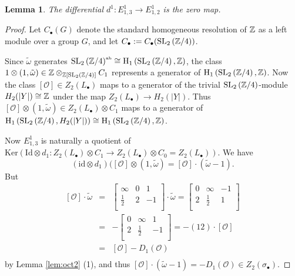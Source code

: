 \documentclass[12pt]{amsart}
\newtheorem{lem}{Lemma}[section]
\theoremstyle{definition}
\newcommand{\Z}{\Bbb{Z}}
\newcommand{\oct}{\mathcal{O}}%
\newcommand{\scyc}[1]{\left[ #1 \right]} %
\newcommand{\spl}[2]{\operatorname{SL}_{#1}\left(#2\right)}
\newcommand{\<}{\langle}
\renewcommand{\>}{\rangle}
\renewcommand{\ker}[1]{\mathrm{Ker}(#1)}
\newcommand{\gab}[1]{{#1}^{\mbox{\tiny{ab}}}}%
\newcommand{\ho}[3]{\mathrm{H}_{#1}\left( #2,#3 \right)}
\begin{document}
\begin{lem}\label{lem:d1}  The differential $d^1:E^1_{1,3}\to E^1_{1,2}$ is the zero map.
\end{lem}
\begin{proof} Let $C_\bullet(G)$ denote the standard homogeneous resolution of $\Z$ as a left module over a group $G$, and let $C_\bullet:=C_\bullet(\spl{2}{\Z/4})$.

Since $\tilde{\omega}$ generates $\gab{\spl{2}{\Z/4}}\cong\ho{1}{\spl{2}{\Z/4}}{\Z}$, the class $1\otimes (1,\tilde{\omega})\in \Z\otimes_{\Z[\spl{2}{\Z/4}]}C_1$ represents a generator of $\ho{1}{\spl{2}{\Z/4}}{\Z}$. Now the class $\scyc{\oct}\in Z_2(L_\bullet)$ maps to a generator of the trivial $\spl{2}{\Z/4}$-module $H_2(|Y|)\cong \Z$ under the map 
$Z_2(L_\bullet)\to H_2(|Y|)$.  Thus $\scyc{\oct}\otimes (1,\tilde{\omega})\in Z_2(L_\bullet)\otimes C_1$ maps to a generator of $\ho{1}{\spl{2}{\Z/4}}{H_2(|Y|)}\cong\ho{1}{\spl{2}{\Z/4}}{\Z}$.

Now $E^1_{1,3}$ is naturally a quotient of $\ker{\mathrm{Id}\otimes d_1: Z_2(L_\bullet)\otimes C_1\to Z_2(L_\bullet)\otimes C_0=Z_2(L_\bullet)}$. We have
\[
(\mathrm{id}\otimes d_1)(\scyc{\oct}\otimes (1,\tilde{\omega})=\scyc{\oct}\cdot(\tilde{\omega}-1).
\]
But 
\begin{eqnarray*}
\scyc{\oct}\cdot\tilde{\omega}&=&
\left[
\begin{array}{ccc}
\infty&0&1\\
\frac{1}{2}&2&-1\\
\end{array}
\right]\cdot\tilde{\omega}=\left[
\begin{array}{ccc}
0&\infty&-1\\
{2}&\frac12&1\\
\end{array}
\right]\\
&=&-\left[
\begin{array}{ccc}
0&\infty&1\\
{2}&\frac12&-1\\
\end{array}
\right]=-(12)\cdot\scyc{\oct}\\
&=&\scyc{\oct}-D_1(\oct)\\
\end{eqnarray*}
by Lemma \ref{lem:oct2} (1), and thus $\scyc{\oct}\cdot(\tilde{\omega}-1)=-D_1(\oct)\in Z_2(\sigma_\bullet)$.


\end{proof}
\end{document}
